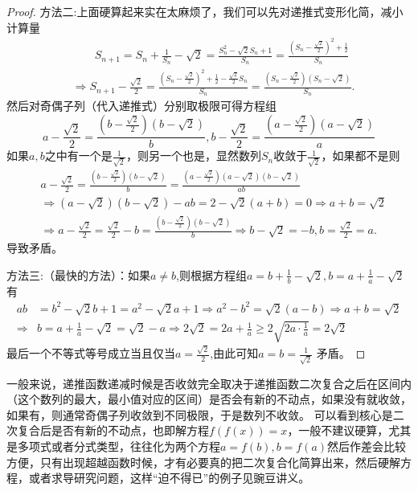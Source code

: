 \documentclass[../../main.tex]{subfiles}%
\begin{document}
\begin{proof}
{\color{blue}方法二:}上面硬算起来实在太麻烦了，我们可以先对递推式变形化简，减小计算量
\begin{align*}
&\qquad S_{n+1}=S_n+\frac{1}{S_n}-\sqrt{2}=\frac{S_{n}^{2}-\sqrt{2}S_n+1}{S_n}=\frac{\left( S_n-\frac{\sqrt{2}}{2} \right) ^2+\frac{1}{2}}{S_n}
\\
&\Longrightarrow S_{n+1}-\frac{\sqrt{2}}{2}=\frac{\left( S_n-\frac{\sqrt{2}}{2} \right) ^2+\frac{1}{2}-\frac{\sqrt{2}}{2}S_n}{S_n}=\frac{\left( S_n-\frac{\sqrt{2}}{2} \right) (S_n-\sqrt{2})}{S_n}.
\end{align*}
然后对奇偶子列（代入递推式）分别取极限可得方程组
\[a-\frac{\sqrt{2}}{2}=\frac{\left(b-\frac{\sqrt{2}}{2}\right)(b - \sqrt{2})}{b},b-\frac{\sqrt{2}}{2}=\frac{\left(a-\frac{\sqrt{2}}{2}\right)(a - \sqrt{2})}{a}\]
如果\(a,b\)之中有一个是\(\frac{1}{\sqrt{2}}\)，则另一个也是，显然数列\(S_n\)收敛于\(\frac{1}{\sqrt{2}}\)，如果都不是则
\begin{align*}
&a-\frac{\sqrt{2}}{2}=\frac{\left( b-\frac{\sqrt{2}}{2} \right) (b-\sqrt{2})}{b}=\frac{\left( a-\frac{\sqrt{2}}{2} \right) (a-\sqrt{2})(b-\sqrt{2})}{ab}
\\
&\Rightarrow \left( a-\sqrt{2} \right) \left( b-\sqrt{2} \right) -ab=2-\sqrt{2}(a+b)=0\Rightarrow a+b=\sqrt{2}
\\
&\Rightarrow a-\frac{\sqrt{2}}{2}=\frac{\sqrt{2}}{2}-b=\frac{\left( b-\frac{\sqrt{2}}{2} \right) (b-\sqrt{2})}{b}\Rightarrow b-\sqrt{2}=-b,b=\frac{\sqrt{2}}{2}=a.
\end{align*}
导致矛盾。

{\color{blue}方法三:}（最快的方法）：如果\(a\neq b\),则根据方程组\(a = b+\frac{1}{b}-\sqrt{2},b = a+\frac{1}{a}-\sqrt{2}\)有
\begin{align*}
ab&=b^2-\sqrt{2}b+1=a^2-\sqrt{2}a+1\Rightarrow a^2-b^2=\sqrt{2}\left( a-b \right) \Rightarrow a+b=\sqrt{2}\\
\Rightarrow &b=a+\frac{1}{a}-\sqrt{2}=\sqrt{2}-a\Rightarrow 2\sqrt{2}=2a+\frac{1}{a}\geqslant 2\sqrt{2a\cdot\frac{1}{a}}=2\sqrt{2}
\end{align*}
最后一个不等式等号成立当且仅当$a=\frac{\sqrt{2}}{2}$,由此可知\(a = b=\frac{1}{\sqrt{2}}\) 矛盾。

\end{proof}
\begin{remark}
一般来说，递推函数递减时候是否收敛完全取决于递推函数二次复合之后在区间内（这个数列的最大，最小值对应的区间）是否会有新的不动点，如果没有就收敛，如果有，则通常奇偶子列收敛到不同极限，于是数列不收敛。
可以看到核心是二次复合后是否有新的不动点，也即解方程\(f(f(x)) = x\)，一般不建议硬算，尤其是多项式或者分式类型，往往化为两个方程\(a = f(b),b = f(a)\)然后作差会比较方便，只有出现超越函数时候，才有必要真的把二次复合化简算出来，然后硬解方程，或者求导研究问题，这样“迫不得已”的例子见豌豆讲义。
\end{remark}
\end{document}
